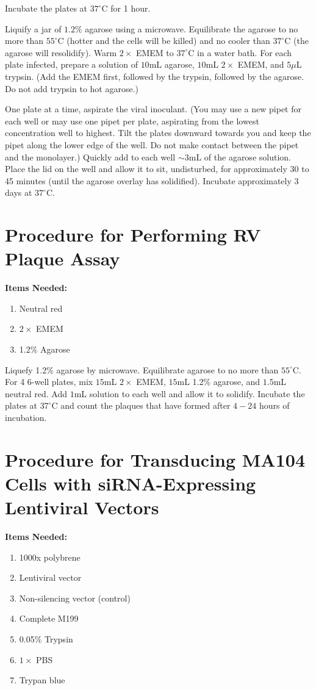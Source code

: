Incubate the plates at $37^{\circ}$C for 1 hour.

Liquify a jar of $1.2\%$ agarose using a microwave. Equilibrate the agarose to no more than $55^{\circ}$C (hotter and the cells will be killed) and no cooler than $37^{\circ}$C (the agarose will resolidify). Warm $2\times$ EMEM to $37^{\circ}$C in a water bath. For each plate infected, prepare a solution of $10$mL agarose, $10$mL $2\times$ EMEM, and $5\mu$L trypsin. (Add the EMEM first, followed by the trypsin, followed by the agarose. Do not add trypsin to hot agarose.)

One plate at a time, aspirate the viral inoculant. (You may use a new pipet for each well or may use one pipet per plate, aspirating from the lowest concentration well to highest. Tilt the plates downward towards you and keep the pipet along the lower edge of the well. Do not make contact between the pipet and the monolayer.) Quickly add to each well $\sim 3$mL of the agarose solution. Place the lid on the well and allow it to sit, undisturbed, for approximately 30 to 45 minutes (until the agarose overlay has solidified). Incubate approximately 3 days at $37^{\circ}$C.

\section{Procedure for Performing RV Plaque Assay}

{\bfseries Items Needed:} \begin{enumerate}
	\item Neutral red
	\item $2\times$ EMEM
	\item 1.2\% Agarose
\end{enumerate}

Liquefy 1.2\% agarose by microwave. Equilibrate agarose to no more than $55^{\circ}$C. For 4 6-well plates, mix $15$mL $2\times$ EMEM, $15$mL 1.2\% agarose, and $1.5$mL neutral red. Add $1$mL solution to each well and allow it to solidify. Incubate the plates at $37^{\circ}$C and count the plaques that have formed after $4-24$ hours of incubation.

\section{Procedure for Transducing MA104 Cells with siRNA-Expressing Lentiviral Vectors}

{\bfseries Items Needed:} \begin{enumerate}
	\item 1000x polybrene
	\item Lentiviral vector
	\item Non-silencing vector (control)
	\item Complete M199
	\item 0.05\% Trypsin
	\item $1\times$ PBS
	\item Trypan blue
\end{enumerate}

